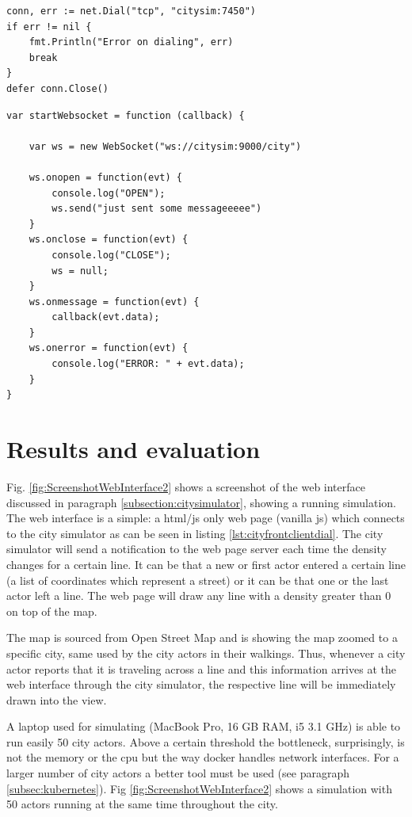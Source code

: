 \documentclass[conference]{IEEEtran}
\begin{document}
\begin{lstlisting}[caption=City actor dialing City simulator, label=lst:gocityclientdial]
conn, err := net.Dial("tcp", "citysim:7450")
if err != nil {
    fmt.Println("Error on dialing", err)
    break
}
defer conn.Close()
\end{lstlisting}

\begin{lstlisting}[caption=City front dialing City simulator, label=lst:cityfrontclientdial]
var startWebsocket = function (callback) {

    var ws = new WebSocket("ws://citysim:9000/city")

    ws.onopen = function(evt) {
        console.log("OPEN");
        ws.send("just sent some messageeeee")
    }
    ws.onclose = function(evt) {
        console.log("CLOSE");
        ws = null;
    }
    ws.onmessage = function(evt) {
        callback(evt.data);
    }
    ws.onerror = function(evt) {
        console.log("ERROR: " + evt.data);
    }
}
\end{lstlisting}

\section{Results and evaluation}
\label{sec:results}

Fig. \ref{fig:ScreenshotWebInterface2} shows a screenshot of the web interface discussed in paragraph \ref{subsection:citysimulator}, showing a running simulation. The web interface is a simple: a html/js only web page (vanilla js) which connects to the city simulator as can be seen in listing \ref{lst:cityfrontclientdial}. The city simulator will send a notification to the web page server each time the density changes for a certain line. It can be that a new or first actor entered a certain line (a list of coordinates which represent a street) or it can be that one or the last actor left a line. The web page will draw any line with a density greater than 0 on top of the map.

The map is sourced from Open Street Map \cite{openstreetmap} and is showing the map zoomed to a specific city, same used by the city actors in their walkings. Thus, whenever a city actor reports that it is traveling across a line and this information arrives at the web interface through the city simulator, the respective line will be immediately drawn into the view.

A laptop used for simulating (MacBook Pro, 16 GB RAM, i5 3.1 GHz) is able to run easily 50 city actors. Above a certain threshold the bottleneck, surprisingly, is not the memory or the cpu but the way docker handles network interfaces. For a larger number of city actors a better tool must be used (see paragraph \ref{subsec:kubernetes}). Fig \ref{fig:ScreenshotWebInterface2} shows a simulation with 50 actors running at the same time throughout the city.
\end{document}
